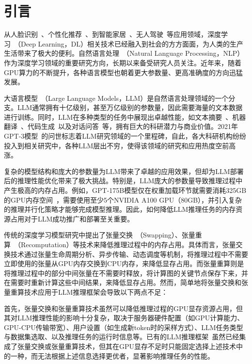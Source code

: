 \section{引言}

从人脸识别~\cite{Face-Recognition}、个性化推荐~\cite{Personal-Recommendation}、到智能家居~\cite{Smart-Home}、无人驾驶~\cite{Self-Driving-Car}等应用领域，深度学习~\cite{Deep-Learning}（Deep Learning，DL）相关技术已经融入到社会的方方面面，为人类的生产生活带来了极大的便利。自然语言处理~\cite{NLP}（Natural Language Processing，NLP）作为深度学习领域的重要研究方向，长期以来备受研究人员关注。近年来，随着GPU算力的不断提升，各种语言模型也朝着更大参数量、更高准确度的方向迅猛发展。

大语言模型~\cite{LLM}（Large Language Models，LLM）是自然语言处理领域的一个分支。LLM通常拥有十亿级别，甚至万亿级别的参数量，因此需要海量的文本数据进行训练。同时，LLM在多种类型的任务中展现出卓越性能，如文本摘要~\cite{Text-Summarization}、机器翻译~\cite{Machine-Translation}、代码生成~\cite{Code-Generation}以及对话问答~\cite{Question-Answer}等，拥有巨大的科研潜力与商业价值。2021年GPT-3模型~\cite{Text-Summarization, GPT3}的问世标志着LLM研究领域的一个里程碑，自此，各大科研机构纷纷投入到相关研究中，各种LLM层出不穷，使得该领域的研究和应用热度空前高涨。

复杂的模型结构和庞大的参数量为LLM带来了卓越的应用效果，但却为LLM部署后的推理性能优化带来了极大挑战。特别是，LLM庞大的参数量导致推理过程中产生极高的内存占用。例如，GPT-175B模型仅在权重加载环节就需要消耗325GB的GPU内存空间~\cite{GPT-175B资源消耗}，需要使用至少5个NVIDIA A100 GPU（80GB），并引入复杂的推理并行化策略才能够完成模型推理。因此，如何降低LLM推理任务的内存资源占用对于LLM成功推广和部署至关重要。

传统的深度学习模型研究中提出了张量交换~\cite{Swapping}（Swapping）、张量重算~\cite{Recomputation}（Recomputation）等技术来降低推理过程中的内存占用。具体而言，张量交换技术通过张量生命周期分析、异步传输、动态调度等机制，将推理过程中不需要立即使用的张量从GPU内存交换到CPU内存，来降低显存占用。而张量重算则是将推理过程中的部分中间张量在不需要时释放，将计算图的关键节点保存下来，并在需要时重新计算这些中间结果，来降低显存占用。然而，简单地将张量交换和张量重算技术应用于LLM推理框架会导致以下两点不足：

首先，张量交换和张量重算技术虽然可以降低推理过程的GPU显存资源占用，但其对LLM推理性能的影响十分复杂，取决于服务器硬件配置（如GPU计算能力、GPU-CPU传输带宽）、用户设置（如生成新token时的采样方式）、LLM任务类型与数据集选取、以及推理任务的运行时信息等。已有的LLM推理框架~\cite{Swapping, vLLM, ORCA}虽然已经集成了张量交换或张量重算技术，但其在GPU显存不足时只能固定选择上述技术中的一种，而无法根据上述信息选择更优者，显著影响推理任务的性能。

